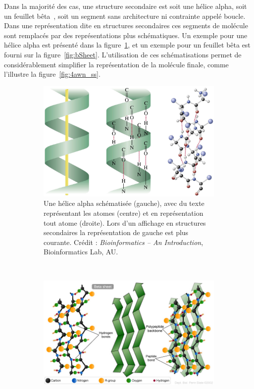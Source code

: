 \begin{appendices}
	Dans la majorité des cas, une structure secondaire est soit une hélice alpha, soit un feuillet bêta~\cite{pauling1951structure}, soit un segment sans architecture ni contrainte appelé boucle. Dans une représentation dite \og en structures secondaires \fg{} ces segments de molécule sont remplacés par des représentations plus schématiques. Un exemple pour une hélice alpha est présenté dans la figure~\ref{fig:aHelix}, et un exemple pour un feuillet bêta est fourni sur la figure~\ref{fig:bSheet}. L'utilisation de ces schématisations permet de considérablement simplifier la représentation de la molécule finale, comme l'illustre la figure~\ref{fig:4awn_ss}.
	
	\begin{figure}[!htbp]
		\begin{subfigure}[b]{.49\textwidth}
			\centering
			\includegraphics[width=\textwidth]{./figures/ch1/aHelix}
			\caption[Hélices alpha, trois représentations différentes]{Une hélice alpha schématisée (gauche), avec du texte représentant les atomes (centre) et en représentation \og tout atome \fg{} (droite). Lors d'un affichage \og en structures secondaires \fg{} la représentation de gauche est plus courante. Crédit : \emph{Bioinformatics -- An Introduction}, Bioinformatics Lab, AU\footnotemark.}
			\label{fig:aHelix}
		\end{subfigure}
		~
		\begin{subfigure}[b]{.49\textwidth}
			\centering
			\includegraphics[width=\textwidth]{./figures/ch1/bSheet}

\end{subfigure}
\end{figure}
\end{appendices}
